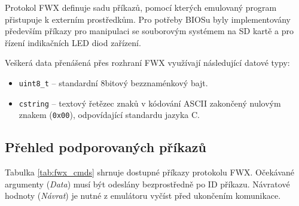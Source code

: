 Protokol FWX definuje sadu příkazů, pomocí kterých emulovaný program přistupuje k externím
prostředkům. Pro potřeby BIOSu byly implementovány především příkazy pro manipulaci se souborovým
systémem na SD kartě a pro řízení indikačních LED diod zařízení.

Veškerá data přenášená přes rozhraní FWX využívají následující datové typy:

\begin{itemize}
    \item \texttt{uint8\_t} -- standardní 8bitový bezznaménkový bajt.
    \item \texttt{cstring} -- textový řetězec znaků v kódování ASCII zakončený nulovým znakem
        (\texttt{0x00}), odpovídající standardu jazyka C.
\end{itemize}

\subsection{Přehled podporovaných příkazů}

Tabulka \ref{tab:fwx_cmds} shrnuje dostupné příkazy protokolu FWX. Očekávané argumenty
(\textit{Data}) musí být odeslány bezprostředně po ID příkazu. Návratové hodnoty (\textit{Návrat})
je nutné z emulátoru vyčíst před ukončením komunikace.

